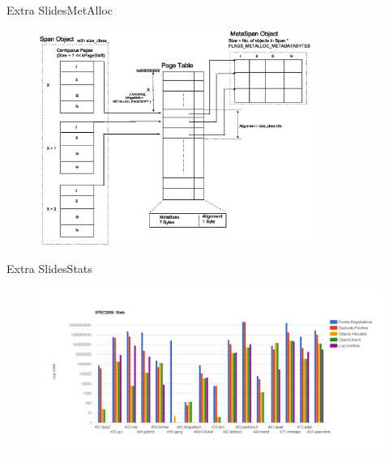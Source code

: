 \documentclass{beamer}
\begin{document}
\begin{frame}{Extra Slides}{MetAlloc}
\begin{figure}[h]
	\centering
	\includegraphics[width=3.5in]{metalloc_heap.eps} 
\end{figure}
\end{frame}

\begin{frame}{Extra Slides}{Stats}
\begin{figure}[h]
	\centering
	\includegraphics[width=5in]{pointer_stats.png} 
\end{figure}
\end{frame}



\end{document}
